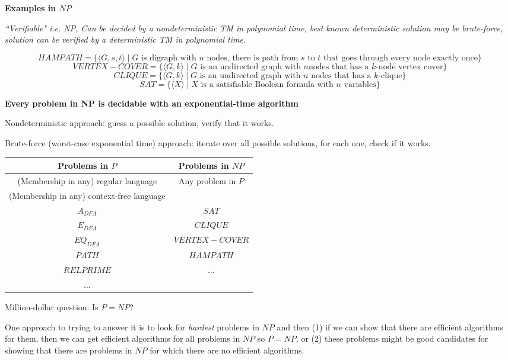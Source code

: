 \documentclass[12pt, oneside]{article}
\begin{document}
\vfill
{\bf Examples in $NP$}

{\it ``Verifiable" i.e. NP, Can be decided by a nondeterministic TM in polynomial time,
best known deterministic solution may be brute-force, 
solution can be verified by a deterministic TM in polynomial time.}

\[
    HAMPATH = \{\langle G,s,t \rangle \mid \textrm{$G$ is digraph with $n$ nodes, there is path
from $s$ to $t$ that goes through every node exactly once}\}
\]
\[
    VERTEX-COVER = \{ \langle G,k\rangle \mid \textrm{$G$ is an undirected graph with $n$
nodes that has a $k$-node vertex cover}\}
\]
\[
    CLIQUE = \{ \langle G,k\rangle \mid \textrm{$G$ is an undirected graph with $n$ nodes that has a $k$-clique}\}
\]
\[
    SAT =\{ \langle X \rangle \mid \textrm{$X$ is a satisfiable Boolean formula with $n$ variables}\}
\]

\vfill
\newpage
{\bf Every problem in NP is decidable with an exponential-time algorithm}

Nondeterministic approach: guess a possible solution, verify that it works.

Brute-force (worst-case exponential time) approach: iterate over all possible solutions, for each 
one, check if it works.



\begin{center}
\begin{tabular}{c|c}
    {\bf Problems in $P$} & {\bf Problems in $NP$}\\
    \hline
    (Membership in any) regular language & Any problem in $P$ \\
    (Membership in any) context-free language &  \\
    $A_{DFA}$ & $SAT$\\
    $E_{DFA}$ & $CLIQUE$ \\
    $EQ_{DFA}$ & $VERTEX-COVER$ \\
    $PATH$ & $HAMPATH$ \\
    $RELPRIME$ &  $\ldots$ \\
$\ldots$ &\\
\end{tabular}
\end{center}

Million-dollar question: Is $P = NP$?


One approach to trying to answer it is to look for {\it hardest} problems in $NP$ and 
then (1) if we can show that there are efficient algorithms for them, then we can get 
efficient algorithms for all problems in $NP$ so $P = NP$, or (2) these problems might 
be good candidates for showing that there are problems in $NP$ for which there 
are no efficient algorithms.
\end{document}
